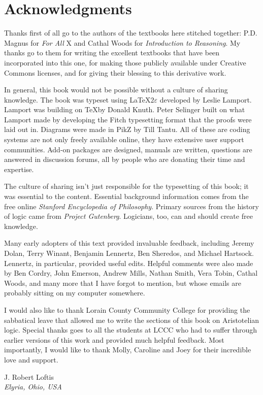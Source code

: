 
\chapter{Acknowledgments}
\begin{fullwidth}
Thanks first of all go to the authors of the textbooks here stitched together: P.D. Magnus for \emph{For All} X and Cathal Woods for \emph{Introduction to Reasoning}. My thanks go to them for writing the excellent textbooks that have been incorporated into this one, for making those publicly available under Creative Commons licenses, and for giving their blessing to this derivative work.

In general, this book would not be possible without a culture of sharing knowledge.   The book was typeset using \LaTeX$2\varepsilon$ developed by Leslie Lamport. Lamport was building on \TeX by Donald Knuth. Peter Selinger built on what Lamport made by developing the Fitch typesetting format that the proofs were laid out in. Diagrams were made in PikZ by Till Tantu. All of these are coding systems are not only freely available online, they have extensive user support communities. Add-on packages are designed, manuals are written, questions are answered in discussion forums, all by people who are donating their time and expertise.

The culture of sharing isn't just responsible for the typesetting of this book; it was essential to the content. Essential background information comes from the free online \textit{Stanford Encyclopedia of Philosophy}. Primary sources from the history of logic came from \textit{Project Gutenberg}. Logicians, too, can and should create free knowledge.

Many early adopters of this text provided invaluable feedback, including Jeremy Dolan, Terry Winant, Benjamin Lennertz, Ben Sheredos, and Michael Hartsock. Lennertz, in particular, provided useful edits. Helpful comments were also made by Ben Cordry, John Emerson, Andrew Mills, Nathan Smith, Vera Tobin, Cathal Woods, and many more that I have forgot to mention, but whose emails are probably sitting on my computer somewhere.

I would also like to thank Lorain County Community College for providing the sabbatical leave that allowed me to write the sections of this book on Aristotelian logic. Special thanks goes to all the students at LCCC who had to suffer through earlier versions of this work and provided much helpful feedback. Most importantly, I would like to thank Molly, Caroline and Joey for their incredible love and support.

 \begin{adjustwidth}{2em}{0em}
 J. Robert Loftis \\
\noindent \emph{Elyria, Ohio, USA}
\end{adjustwidth}
\end{fullwidth}
\pagebreak


